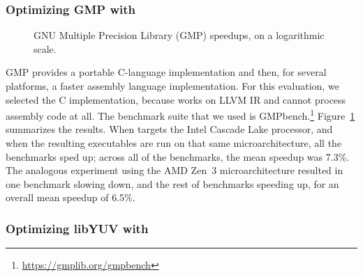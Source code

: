 \subsubsection{Optimizing GMP with \minotaur{}}

\begin{figure}[tbp]
  \centering
  \hfill
  \caption{GNU Multiple Precision Library (GMP) speedups, on a logarithmic scale.}
  \label{fig:gmp}
\end{figure}


GMP provides a portable C-language implementation and then, for
several platforms, a faster assembly language implementation.
%
For this evaluation, we selected the C implementation, because \minotaur{}
works on LLVM IR and cannot process assembly code at all.
%
The benchmark suite that we used is
GMPbench.\footnote{\url{https://gmplib.org/gmpbench}}
%
Figure~\ref{fig:gmp} summarizes the results.
%
When \minotaur{} targets the Intel Cascade Lake processor, and when the
resulting executables are run on that same microarchitecture,
all the benchmarks sped up;
across all of the benchmarks, the mean speedup was 7.3\%.
%
The analogous experiment using the AMD Zen~3 microarchitecture
resulted in one benchmark slowing down, and the rest of benchmarks
speeding up, for an overall mean speedup of 6.5\%.


\subsubsection{Optimizing libYUV with \minotaur{}}





